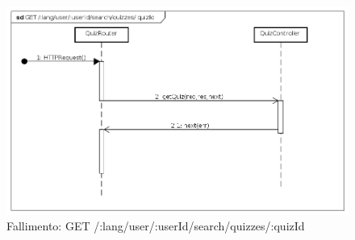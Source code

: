 \begin{itemize}
\begin{figure}[ht]
	\centering
	\includegraphics[scale=0.45]{UML/DiagrammiDiSequenza/Back-end/GET__lang_user__userId_search_quizzes__quizId_failure.png}
	\caption{Fallimento: GET /:lang/user/:userId/search/quizzes/:quizId}
\end{figure}
\FloatBarrier

\end{itemize}
